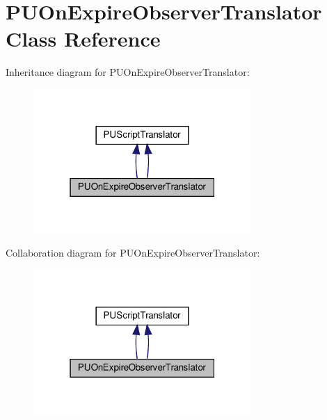 \hypertarget{classPUOnExpireObserverTranslator}{}\section{P\+U\+On\+Expire\+Observer\+Translator Class Reference}
\label{classPUOnExpireObserverTranslator}


Inheritance diagram for P\+U\+On\+Expire\+Observer\+Translator\+:
\nopagebreak
\begin{figure}[H]
\begin{center}
\leavevmode
\includegraphics[width=235pt]{classPUOnExpireObserverTranslator__inherit__graph}
\end{center}
\end{figure}


Collaboration diagram for P\+U\+On\+Expire\+Observer\+Translator\+:
\nopagebreak
\begin{figure}[H]
\begin{center}
\leavevmode
\includegraphics[width=235pt]{classPUOnExpireObserverTranslator__coll__graph}
\end{center}
\end{figure}
